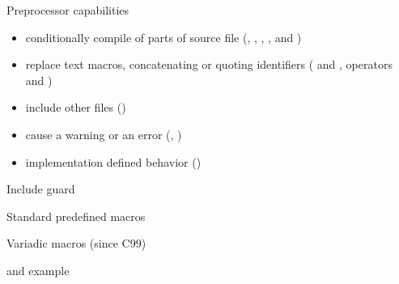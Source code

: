 \begin{frame}{Preprocessor capabilities}
    \begin{itemize}
        \item conditionally compile of parts of source file (, , , ,  and )
        \item replace text macros, concatenating or quoting identifiers ( and , operators \kwblue{\#} and \kwblue{\#\#})
        \item include other files ()
        \item cause a warning or an error (, )
        \item implementation defined behavior ()
    \end{itemize}
\end{frame}
\begin{frame}{Include guard}
    
\end{frame}
\begin{frame}{Standard predefined macros}
    
\end{frame}
\begin{frame}{Variadic macros (since C99)}
    
\end{frame}
\begin{frame}{\kwblack{\#} and \kwblack{\#\#} example}
    \only<1>{
        
    }
\end{frame}
